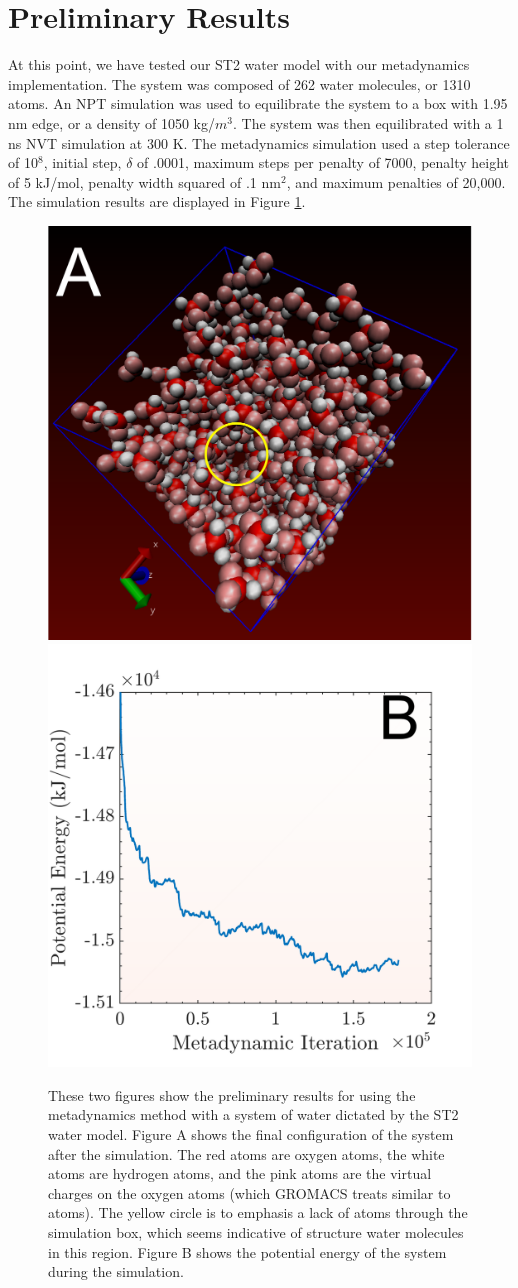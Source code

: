 \section{Preliminary Results}
At this point, we have tested our ST2 water model with our metadynamics implementation.  The system was composed of 262 water molecules, or 1310 atoms.  An NPT simulation was used to equilibrate the system to a box with 1.95 nm edge, or a density of 1050 kg/$m^3$.  The system was then equilibrated with a 1 ns NVT simulation at 300 K.  The metadynamics simulation used a step tolerance of 10$^8$, initial step, $\delta$ of .0001, maximum steps per penalty of 7000, penalty height of 5 kJ/mol, penalty width squared of .1 nm$^2$, and maximum penalties of 20,000.  The simulation results are displayed in Figure \ref{st2}.
\begin{figure}
	\centering
	\includegraphics[width = .45\textwidth]{./Figures/Appendix/st2_water_final.pdf}
	\hspace{.03\textwidth}
	\includegraphics[width = .45\textwidth]{./Figures/Appendix/st2_landscape.pdf}
	\caption{These two figures show the preliminary results for using the metadynamics method with a system of water dictated by the ST2 water model.  Figure A shows the final configuration of the system after the simulation.  The red atoms are oxygen atoms, the white atoms are hydrogen atoms, and the pink atoms are the virtual charges on the oxygen atoms (which GROMACS treats similar to atoms).  The yellow circle is to emphasis a lack of atoms through the simulation box, which seems indicative of structure water molecules in this region. Figure B shows the potential energy of the system during the simulation.}
	\label{st2}
\end{figure}

